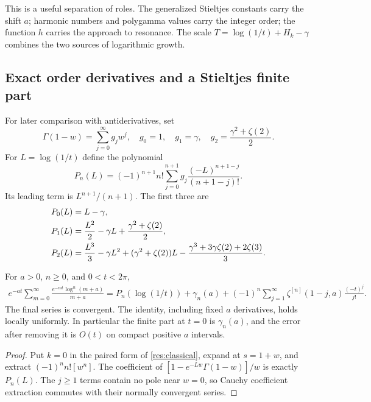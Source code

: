 This is a useful separation of roles. The generalized Stieltjes constants
carry the shift $a$; harmonic numbers and polygamma values carry the integer
order; the function $h$ carries the approach to resonance. The scale
$T=\log(1/t)+H_k-\gamma$ combines the two sources of logarithmic growth.

\subsection{Exact order derivatives and a Stieltjes finite part}
For later comparison with antiderivatives, set
\begin{equation}\label{res:gcoeff}
 \Gamma(1-w)=\sum_{j=0}^{\infty}g_jw^j,
 \quad g_0=1,\quad g_1=\gamma,\quad
 g_2=\frac{\gamma^2+\zeta(2)}2.
\end{equation}
For $L=\log(1/t)$ define the polynomial
\begin{equation}\label{res:P}
 P_n(L)=(-1)^{n+1}n!
       \sum_{j=0}^{n+1}g_j\frac{(-L)^{n+1-j}}{(n+1-j)!}.
\end{equation}
Its leading term is $L^{n+1}/(n+1)$. The first three are
\begin{align}
 P_0(L)&=L-\gamma,\notag\\
 P_1(L)&=\frac{L^2}{2}-\gamma L
                         +\frac{\gamma^2+\zeta(2)}2,\label{res:Plow}\\
 P_2(L)&=\frac{L^3}{3}-\gamma L^2
       +(\gamma^2+\zeta(2))L
       -\frac{\gamma^3+3\gamma\zeta(2)+2\zeta(3)}3.\notag
\end{align}

\begin{proposition}\label{res:finitepart}
For $a>0$, $n\geq0$, and $0<t<2\pi$,
\begin{align}
 e^{-at}\sum_{m=0}^{\infty}
       \frac{e^{-mt}\log^n(m+a)}{m+a}
  =P_n(\log(1/t))+\gamma_n(a)
       +(-1)^n\sum_{j=1}^{\infty}
          \zeta^{[n]}(1-j,a)\frac{(-t)^j}{j!}.
 \label{res:finitepartidentity}
\end{align}
The final series is convergent. The identity, including fixed $a$ derivatives,
holds locally uniformly. In particular the finite part at $t=0$ is
$\gamma_n(a)$, and the error after removing it is $O(t)$ on compact
positive $a$ intervals.
\end{proposition}
\begin{proof}
Put $k=0$ in the paired form of \eqref{res:classical}, expand at
$s=1+w$, and extract $(-1)^nn![w^n]$. The coefficient of
$[1-e^{-Lw}\Gamma(1-w)]/w$ is exactly $P_n(L)$.
The $j\geq1$ terms contain no pole near $w=0$, so Cauchy coefficient
extraction commutes with their normally convergent series.
\end{proof}

